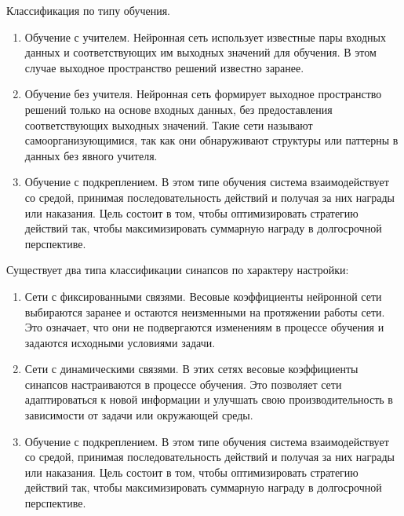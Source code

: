 Классификация по типу обучения.
\begin{enumerate}
\item Обучение с учителем. Нейронная сеть использует известные пары входных данных и соответствующих им выходных значений для обучения. В этом случае выходное пространство решений известно заранее.
\item Обучение без учителя. Нейронная сеть формирует выходное пространство решений только на основе входных данных, без предоставления соответствующих выходных значений. Такие сети называют самоорганизующимися, так как они обнаруживают структуры или паттерны в данных без явного учителя.
\item Обучение с подкреплением. В этом типе обучения система взаимодействует со средой, принимая последовательность действий и получая за них награды или наказания. Цель состоит в том, чтобы оптимизировать стратегию действий так, чтобы максимизировать суммарную награду в долгосрочной перспективе.
\end{enumerate}

Существует два типа классификации синапсов по характеру настройки:
\begin{enumerate}
\item  Сети с фиксированными связями. Весовые коэффициенты нейронной сети выбираются заранее и остаются неизменными на протяжении работы сети. Это означает, что они не подвергаются изменениям в процессе обучения и задаются исходными условиями задачи.
\item Сети с динамическими связями. В этих сетях весовые коэффициенты синапсов настраиваются в процессе обучения. Это позволяет сети адаптироваться к новой информации и улучшать свою производительность в зависимости от задачи или окружающей среды.
 \item Обучение с подкреплением. В этом типе обучения система взаимодействует со средой, принимая последовательность действий и получая за них награды или наказания. Цель состоит в том, чтобы оптимизировать стратегию действий так, чтобы максимизировать суммарную награду в долгосрочной перспективе.
\end{enumerate}

